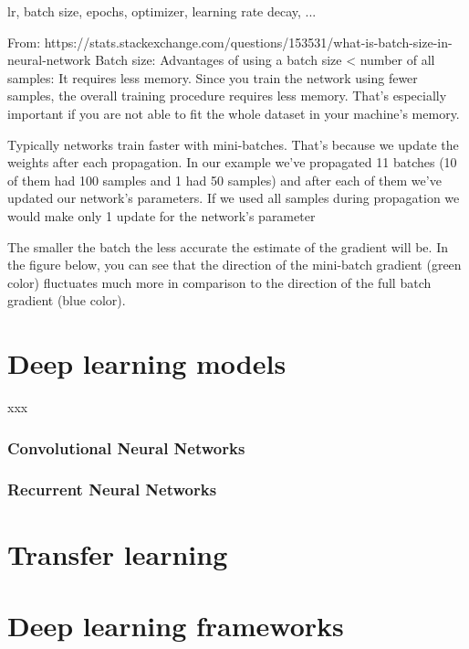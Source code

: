 lr, batch size, epochs, optimizer, learning rate decay, ...


From: https://stats.stackexchange.com/questions/153531/what-is-batch-size-in-neural-network
Batch size: 
Advantages of using a batch size < number of all samples:
It requires less memory. Since you train the network using fewer samples, the overall training procedure requires less memory. That's especially important if you are not able to fit the whole dataset in your machine's memory.

Typically networks train faster with mini-batches. That's because we update the weights after each propagation. In our example we've propagated 11 batches (10 of them had 100 samples and 1 had 50 samples) and after each of them we've updated our network's parameters. If we used all samples during propagation we would make only 1 update for the network's parameter


The smaller the batch the less accurate the estimate of the gradient will be. In the figure below, you can see that the direction of the mini-batch gradient (green color) fluctuates much more in comparison to the direction of the full batch gradient (blue color).


\section{Deep learning models}
xxx

\subsubsection{Convolutional Neural Networks}


\subsubsection{Recurrent Neural Networks}




\section{Transfer learning}




\section{Deep learning frameworks}